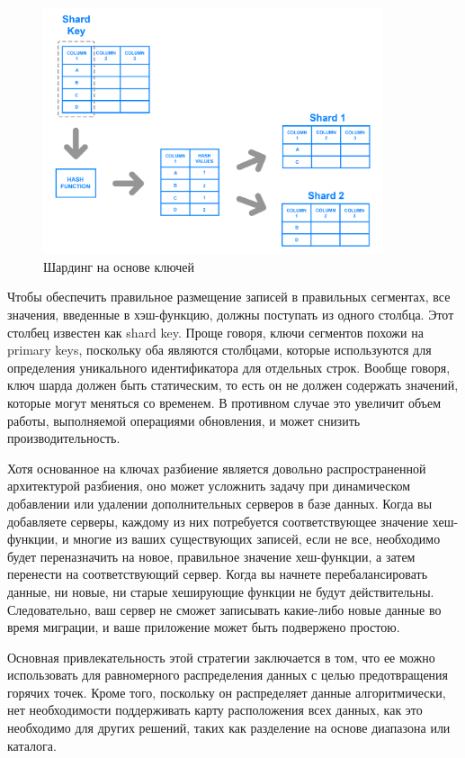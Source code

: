 \begin{figure}[H]
    \centering
    \includegraphics[width=100mm]{assets/distributed/Keybased-Sharding}
    \caption{Шардинг на основе ключей}
    \label{fig:Keybased-Sharding}
\end{figure}

Чтобы обеспечить правильное размещение записей в правильных сегментах, все значения, введенные в хэш-функцию, должны
поступать из одного столбца. Этот столбец известен как shard key. Проще говоря, ключи сегментов похожи на primary keys,
поскольку оба являются столбцами, которые используются для определения уникального идентификатора для отдельных строк.
Вообще говоря, ключ шарда должен быть статическим, то есть он не должен содержать значений, которые могут меняться со
временем. В противном случае это увеличит объем работы, выполняемой операциями обновления, и может снизить
производительность.

Хотя основанное на ключах разбиение является довольно распространенной архитектурой разбиения, оно может усложнить
задачу при динамическом добавлении или удалении дополнительных серверов в базе данных. Когда вы добавляете серверы,
каждому из них потребуется соответствующее значение хеш-функции, и многие из ваших существующих записей, если не все,
необходимо будет переназначить на новое, правильное значение хеш-функции, а затем перенести на соответствующий сервер.
Когда вы начнете перебалансировать данные, ни новые, ни старые хеширующие функции не будут действительны. Следовательно,
ваш сервер не сможет записывать какие-либо новые данные во время миграции, и ваше приложение может быть подвержено
простою.

Основная привлекательность этой стратегии заключается в том, что ее можно использовать для равномерного распределения
данных с целью предотвращения горячих точек. Кроме того, поскольку он распределяет данные алгоритмически, нет
необходимости поддерживать карту расположения всех данных, как это необходимо для других решений, таких как разделение
на основе диапазона или каталога. \autocite{DatabaseSharding}

